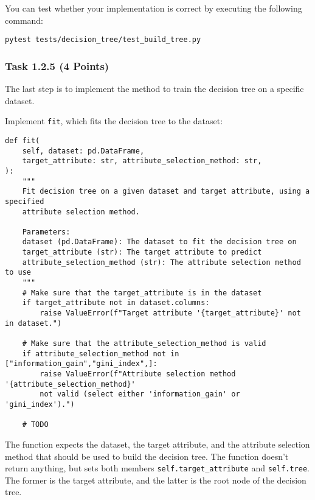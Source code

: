 \documentclass[
english,
smallborders
]{i6prcsht}
\newcommand{\points}[1]{\hfill \color{red}(#1 Points)\color{black}}
\begin{document}
You can test whether your implementation is correct by executing the following command:

\vspace*{0.3cm}

\begin{lstlisting}
pytest tests/decision_tree/test_build_tree.py
\end{lstlisting}

\vspace*{0.1cm}

\subsubsection*{Task 1.2.5 \points{4}}

The last step is to implement the method to train the decision tree on a specific dataset.

Implement \texttt{fit}, which fits the decision tree to the dataset:

\vspace*{0.3cm}

\begin{lstlisting}
def fit(
	self, dataset: pd.DataFrame,
	target_attribute: str, attribute_selection_method: str,
):
	"""
	Fit decision tree on a given dataset and target attribute, using a specified
	attribute selection method.

	Parameters:
	dataset (pd.DataFrame): The dataset to fit the decision tree on
	target_attribute (str): The target attribute to predict
	attribute_selection_method (str): The attribute selection method to use
	"""
	# Make sure that the target_attribute is in the dataset
	if target_attribute not in dataset.columns:
		raise ValueError(f"Target attribute '{target_attribute}' not in dataset.")

	# Make sure that the attribute_selection_method is valid
	if attribute_selection_method not in ["information_gain","gini_index",]:
		raise ValueError(f"Attribute selection method '{attribute_selection_method}'
		not valid (select either 'information_gain' or 'gini_index').")

	# TODO
\end{lstlisting}

\vspace*{0.1cm}

The function expects the dataset, the target attribute, and the attribute selection method that should be used to build the decision tree. The function doesn't return anything, but sets both members \texttt{self.target\_attribute} and \texttt{self.tree}. The former is the target attribute, and the latter is the root node of the decision tree.
\end{document}

